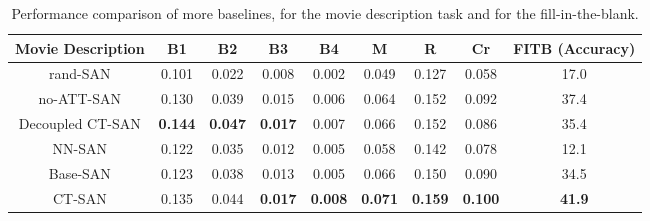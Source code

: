 \documentclass[10pt,twocolumn,letterpaper]{article}
\theoremstyle{nonumberplain}
\begin{document}
\begin{table*}[h!]
\centering
\small
\newcommand{\ul}[1]{{#1}}
\newcommand{\ranked}[1]{\xspace\scriptsize\sf{(#1)}}


\setlength\tabcolsep{7.0pt}
\begin{tabular}{|c|ccccccc|c|}
\hline
{\footnotesize Movie Description}
           & B1             & B2             & B3             & B4             & M              & R              & Cr             & FITB (Accuracy)     \\ \hline
rand-SAN   & 0.101          & 0.022          & 0.008          & 0.002          & 0.049          & 0.127          & 0.058          & 17.0     \\
no-ATT-SAN & 0.130          & 0.039          & 0.015          & 0.006          & 0.064          & 0.152          & 0.092          & 37.4     \\
Decoupled CT-SAN & \textbf{0.144} & \textbf{0.047} & \textbf{0.017} & 0.007& 0.066 & 0.152 & 0.086 & 35.4 \\
NN-SAN     & 0.122          & 0.035          & 0.012          & 0.005          & 0.058          & 0.142          & 0.078          & 12.1     \\
\hline
Base-SAN   & 0.123          & 0.038          & 0.013          & 0.005          & 0.066          & 0.150          & 0.090          & 34.5     \\
CT-SAN     & 0.135          & 0.044          & \textbf{0.017} & \textbf{0.008} & \textbf{0.071} & \textbf{0.159} & \textbf{0.100} & \textbf{41.9}  \\ \hline
\end{tabular}

\medskip
\caption{
Performance comparison of more baselines, for the movie description task
    and for the fill-in-the-blank.
}
\label{tbl:supp_experiments_mf}
\vspace{-7pt}
\end{table*}
\end{document}
